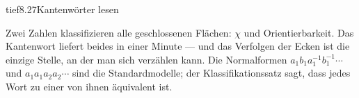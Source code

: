 \begin{loesungkarte}{tief}{8.27}{Kantenwörter lesen}
\begin{mitnehmen}\kastentext
Zwei Zahlen klassifizieren alle geschlossenen Flächen: $\chi$ und Orientierbarkeit. Das Kantenwort liefert beides in einer Minute --- und das Verfolgen der Ecken ist die einzige Stelle, an der man sich verzählen kann. Die Normalformen $a_1b_1a_1^{-1}b_1^{-1}\cdots$ und $a_1a_1a_2a_2\cdots$ sind die Standardmodelle; der Klassifikationssatz sagt, dass jedes Wort zu einer von ihnen äquivalent ist.
\end{mitnehmen}
\end{loesungkarte}


